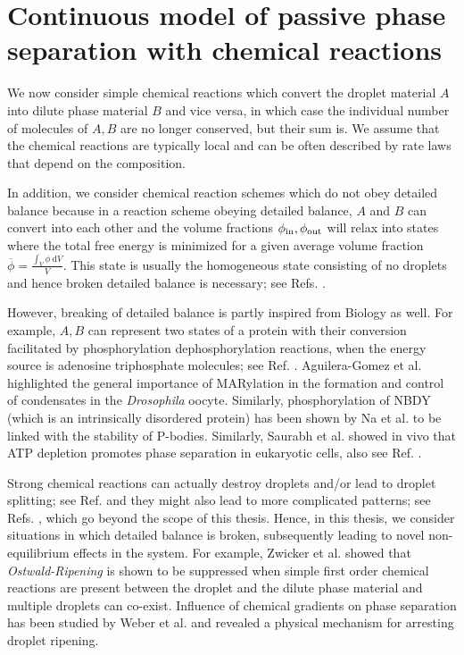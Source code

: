 \section{Continuous model of passive phase separation with chemical reactions}

We now consider simple chemical reactions which convert the droplet material $A$ into dilute phase material $B$ and vice versa, in which case the individual number of molecules of $A,B$ are no longer conserved, but their sum is.
We assume that the chemical reactions are typically local and can be often described by rate laws that depend on the composition.

In addition, we consider chemical reaction schemes which do not obey detailed balance because in a reaction scheme obeying detailed balance, $A$ and $B$ can convert into each other and the volume fractions $\phi_\mathrm{in}, \phi_\mathrm{out}$ will relax into states where the total free energy is minimized for a given average volume fraction $\overline{\phi} = \frac{\int_V \phi ~ \mathrm{d}V}{V}$.
This state is usually the homogeneous state consisting of no droplets and hence broken detailed balance is necessary; see Refs. \cite{Zwicker2015,Review2019}.

However, breaking of detailed balance is partly inspired from Biology as well.
For example, $A, B$ can represent two states of a protein with their conversion facilitated by phosphorylation dephosphorylation reactions, when the energy source is adenosine triphosphate molecules; see Ref. \cite{AlbertsBook2003}.
Aguilera-Gomez et al. \cite{Aguilera_Gomez2017} highlighted the general importance of MARylation in the formation and control of condensates in the \textit{Drosophila} oocyte.
Similarly, phosphorylation of NBDY (which is an intrinsically disordered protein) has been shown by Na et al. \cite{Na2021} to be linked with the stability of P-bodies.
Similarly, Saurabh et al. \cite{Saurabh2022} showed in vivo that ATP depletion promotes phase separation in eukaryotic cells, also see Ref. \cite{Pattanayak2020}.

Strong chemical reactions can actually destroy droplets and/or lead to droplet splitting; see Ref. \cite{Zwicker_nature_2016} and they might also lead to more complicated patterns; see Refs. \cite{Glotzer1995,Christensen1996}, which go beyond the scope of this thesis.
Hence, in this thesis, we consider situations in which detailed balance is broken, subsequently leading to novel non-equilibrium effects in the system.
For example, Zwicker et al. \cite{Zwicker2015,Zwicker2014} showed that \textit{Ostwald-Ripening} is shown to be suppressed when simple first order chemical reactions are present between the droplet and the dilute phase material and multiple droplets can co-exist.
Influence of chemical gradients on phase separation has been studied by Weber et al. \cite{Weber2017} and revealed a physical mechanism for arresting droplet ripening.

